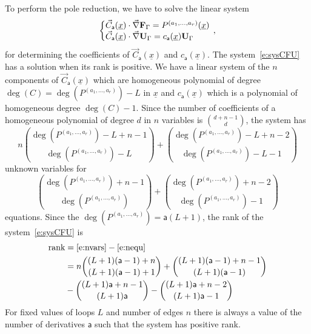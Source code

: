 \documentclass[a4paper,12pt]{article}
\numberwithin{equation}{section}
\numberwithin{figure}{section}
\begin{document}
To perform the pole reduction, 
 we have to solve the linear system
\begin{equation}\label{e:sysCFU}
   \left\{\begin{array}{@{}l@{}}
\vec C_{\mathsf{a}} (\underline x) \cdot \vec \nabla \textbf{F}_\Gamma
            =    P^{(a_1,\dots,a_r)}(\underline x)\\
\vec C_{\mathsf{a}} (\underline x)\cdot\vec \nabla\textbf{U}_\Gamma= c_{{\mathsf{a}}}(\underline x) \textbf{U}_\Gamma 
  \end{array}\right.\,,
\end{equation}
for determining the coefficients of $\vec C_{\mathsf{a}}(\underline
x)$ and $c_{\mathsf{a}}(\underline x)$.
%
The system~\eqref{e:sysCFU} has a solution when its rank is positive.
We have a linear system of the $n$ components of $\vec C_{\mathsf{a}}(\underline
x) $ which are homogeneous polynomial of degree $\deg(C)=\deg( P^{(a_1,\dots,a_r)})-L $ in
$\underline x$ and  $ c_{{\mathsf{a}}}(\underline x) $ which is a polynomial of
homogeneous degree $\deg(C)-1$.   Since the number of coefficients of
a homogeneous polynomial of degree $d$ in $n$ variables is
$\binom{d+n-1}{d}$,  the system has
\begin{equation}\label{e:nvars}
n \binom{\deg( P^{(a_1,\dots,a_r)})-L+n-1}{\deg( P^{(a_1,\dots,a_r)})-L}+\binom{\deg( P^{(a_1,\dots,a_r)})-L+n-2}{\deg( P^{(a_1,\dots,a_r)})-L-1}
\end{equation} unknown variables for
\begin{equation}\label{e:nequ}
\binom{\deg( P^{(a_1,\dots,a_r)})+n-1}{\deg( P^{(a_1,\dots,a_r)})}+\binom{\deg( P^{(a_1,\dots,a_r)})+n-2}{\deg( P^{(a_1,\dots,a_r)})-1}
\end{equation}
equations.
%
%
Since the $\deg(P^{(a_1,\dots,a_r)})=\mathsf{a}(L+1)$, the rank of the system~\eqref{e:sysCFU} is
  \begin{align}
    \label{e:Rank}
    \textrm{rank}&=\eqref{e:nvars}-\eqref{e:nequ}\\
\nonumber    &=n \binom{(L+1)(\mathsf{a}-1)+n
               }{(L+1) (\mathsf{a}-1)+1}+\binom{(L+1)(\mathsf{a}-1)+n-1}{(L+1) (\mathsf{a}-1)}\cr
             \nonumber    &
                              -\binom{(L+1) \mathsf{a}+n-1}{(L+1) \mathsf{a}}-\binom{(L+1) \mathsf{a}+n-2}{(L+1) \mathsf{a}-1}
  \end{align}
For fixed values of loops  $L$
and number of edges $n$ there is always a value of the
number of derivatives $\mathsf{a}$ such that the system has
positive rank.
\end{document}
